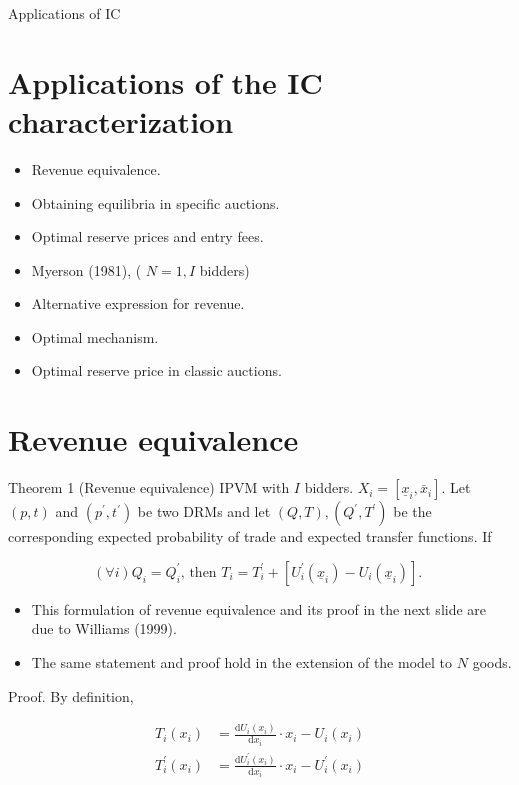 \documentclass[10pt]{article}
\begin{document}
Applications of IC

\section*{Applications of the IC characterization}
\begin{itemize}
  \item Revenue equivalence.
  \item Obtaining equilibria in specific auctions.
  \item Optimal reserve prices and entry fees.
  \item Myerson (1981), ( $N=1, I$ bidders)
  \item Alternative expression for revenue.
  \item Optimal mechanism.
  \item Optimal reserve price in classic auctions.
\end{itemize}

\section*{Revenue equivalence}
Theorem 1 (Revenue equivalence) IPVM with $I$ bidders. $X_{i}=\left[\underline{x}_{i}, \bar{x}_{i}\right]$. Let $(p, t)$ and $\left(p^{\prime}, t^{\prime}\right)$ be two DRMs and let $(Q, T),\left(Q^{\prime}, T^{\prime}\right)$ be the corresponding expected probability of trade and expected transfer functions. If

$$
(\forall i) Q_{i}=Q_{i}^{\prime} \text {, then } T_{i}=T_{i}^{\prime}+\left[U_{i}^{\prime}\left(\underline{x}_{i}\right)-U_{i}\left(\underline{x}_{i}\right)\right] \text {. }
$$

\begin{itemize}
  \item This formulation of revenue equivalence and its proof in the next slide are due to Williams (1999).
  \item The same statement and proof hold in the extension of the model to $N$ goods.
\end{itemize}

Proof. By definition,

$$
\begin{aligned}
T_{i}\left(x_{i}\right) & =\frac{\mathrm{d} U_{i}\left(x_{i}\right)}{\mathrm{d} x_{i}} \cdot x_{i}-U_{i}\left(x_{i}\right) \\
T_{i}^{\prime}\left(x_{i}\right) & =\frac{\mathrm{d} U_{i}^{\prime}\left(x_{i}\right)}{\mathrm{d} x_{i}} \cdot x_{i}-U_{i}^{\prime}\left(x_{i}\right)
\end{aligned}
$$
\end{document}
